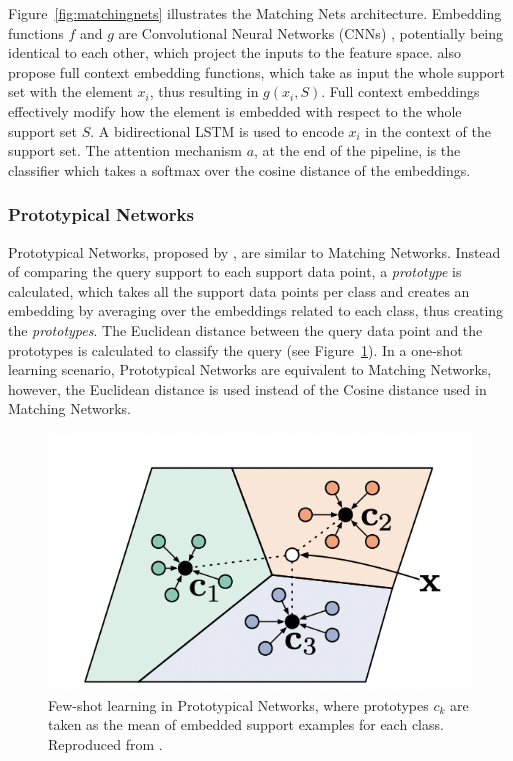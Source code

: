 Figure~\ref{fig:matchingnets} illustrates the Matching Nets architecture. Embedding functions $f$ and $g$ are Convolutional Neural Networks (CNNs) \citep{lecun1995convolutional}, potentially being identical to each other, which project the inputs to the feature space. \citet{vinyals2016matching} also propose full context embedding functions, which take as input the whole support set with the element $x_i$, thus resulting in \( g(x_i, S) \). Full context embeddings effectively modify how the element is embedded with respect to the whole support set $S$. A bidirectional LSTM is used to encode $x_i$ in the context of the support set. The attention mechanism $a$, at the end of the pipeline, is the classifier which takes a softmax over the cosine distance of the embeddings. 


\subsubsection{Prototypical Networks}

Prototypical Networks, proposed by \citet{snell2017prototypical}, are similar to Matching Networks. Instead of comparing the query support to each support data point, a \textit{prototype} is calculated, which takes all the support data points per class and creates an embedding by averaging over the embeddings related to each class, thus creating the \textit{prototypes}. The Euclidean distance between the query data point and the prototypes is calculated to classify the query (see Figure~\ref{fig:protonets}). In a one-shot learning scenario, Prototypical Networks are equivalent to Matching Networks, however, the Euclidean distance is used instead of the Cosine distance used in Matching Networks.

\begin{figure}[!ht]
	\centering
	\includegraphics[width=0.7\linewidth]{img/protonets.png}
	\caption{Few-shot learning in Prototypical Networks, where prototypes \textbf{$c_k$} are taken as the mean of embedded support examples for each class. Reproduced from \citet{snell2017prototypical}.}
	\label{fig:protonets}
\end{figure}

